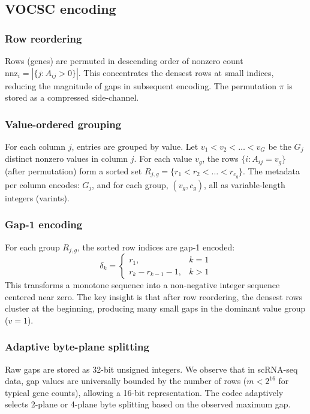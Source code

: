 \documentclass[10pt,twocolumn,letterpaper]{article}
\begin{document}
\subsection{VOCSC encoding}

\subsubsection{Row reordering}
Rows (genes) are permuted in descending order of nonzero count $\text{nnz}_i = |\{j : A_{ij} > 0\}|$.
This concentrates the densest rows at small indices, reducing the magnitude of gaps in subsequent encoding.
The permutation $\pi$ is stored as a compressed side-channel.

\subsubsection{Value-ordered grouping}
For each column $j$, entries are grouped by value.
Let $v_1 < v_2 < \ldots < v_G$ be the $G_j$ distinct nonzero values in column $j$.
For each value $v_g$, the rows $\{i : A_{ij} = v_g\}$ (after permutation) form a sorted set $R_{j,g} = \{r_1 < r_2 < \ldots < r_{c_g}\}$.
The metadata per column encodes: $G_j$, and for each group, $(v_g, c_g)$, all as variable-length integers (varints).

\subsubsection{Gap-1 encoding}
For each group $R_{j,g}$, the sorted row indices are gap-1 encoded:
\begin{equation}
\delta_k = \begin{cases}
r_1, & k = 1 \\
r_k - r_{k-1} - 1, & k > 1
\end{cases}
\label{eq:gap1}
\end{equation}
This transforms a monotone sequence into a non-negative integer sequence centered near zero.
The key insight is that after row reordering, the densest rows cluster at the beginning, producing many small gaps in the dominant value group ($v=1$).

\subsubsection{Adaptive byte-plane splitting}
Raw gaps are stored as 32-bit unsigned integers.
We observe that in scRNA-seq data, gap values are universally bounded by the number of rows ($m < 2^{16}$ for typical gene counts), allowing a 16-bit representation.
The codec adaptively selects 2-plane or 4-plane byte splitting based on the observed maximum gap.
\end{document}
